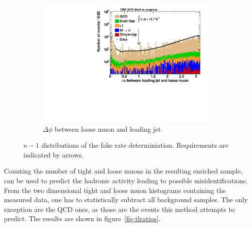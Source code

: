 \begin{figure}[htbp!]
  \ContinuedFloat
  \centering
  \begin{subfigure}[b]{0.495\textwidth}
    \centering
    \includegraphics[width=\textwidth]{plots/nTL_jetdphi.pdf}
    \caption{$\Delta \phi$ between loose muon and leading jet \label{fig:ntljetdphi}}
  \end{subfigure}

  \caption{$n - 1$ distributions of the fake rate determiniation. Requirements are indicated by arrows.}
  \label{fig:ntl}
\end{figure}

Counting the number of tight and loose muons in the resulting enriched sample, can be used to predict the hadronic activity leading to possible misidentifications. From the two dimensional tight and loose muon histograms containing the measured data, one has to statistically subtract all background samples. The only exception are the QCD ones, as those are the events this method attempts to predict. The results are shown in figure~\ref{fig:tlratios}.
 
